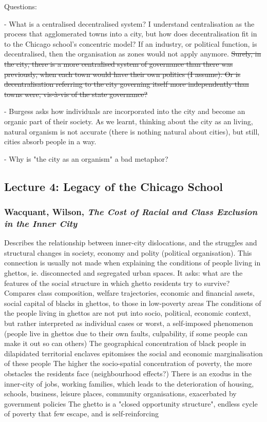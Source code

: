 \documentclass{article}
\begin{document}
Questions:

- What is a centralised decentralised system? I understand centralisation as the process that agglomerated towns into a city, but how does decentralisation fit in to the Chicago school's concentric model? If an industry, or political function, is decentralised, then the organisation as zones would not apply anymore.
\sout{Surely, in the city, there is a more centralised system of governance than there was previously, when each town would have their own politics (I assume). Or is decentralisation referring to the city governing itself more independently than towns were, vis-à-vis of the state governance?}\

- Burgess asks how individuals are incorporated into the city and become an organic part of their society. As we learnt, thinking about the city as an living, natural organism is not accurate (there is nothing natural about cities), but still, cities absorb people in a way. 

- Why is "the city as an organism" a bad metaphor? 

\subsection{Lecture 4: Legacy of the Chicago School}

\subsubsection{Wacquant, Wilson, \textit{The Cost of Racial and Class Exclusion in the Inner City}}

\begin{outline}
	\1 Describes the relationship between inner-city dislocations, and the struggles and structural changes in society, economy and polity (political organisation). This connection is usually not made when explaining the conditions of people living in ghettos, ie. disconnected and segregated urban spaces. It asks: what are the features of the social structure in which ghetto residents try to survive? 
		\2 Compares class composition, welfare trajectories, economic and financial assets, social capital of blacks in ghettos, to those in low-poverty areas
	\1 The conditions of the people living in ghettos are not put into socio, political, economic context, but rather interpreted as individual cases or worst, a self-imposed phenomenon (people live in ghettos due to their own faults, culpability, if some people can make it out so can others)
	\1 The geographical concentration of black people in dilapidated territorial enclaves epitomises the social and economic marginalisation of these people
		\2 The higher the socio-spatial concentration of poverty, the more obstacles the residents face (neighbourhood effects?)
		\2 There is an exodus in the inner-city of jobs, working families, which leads to the deterioration of housing, schools, business, leisure places, community organisations, exacerbated by government policies
		\2 The ghetto is a "closed opportunity structure", endless cycle of poverty that few escape, and is self-reinforcing
\end{outline}
\end{document}
